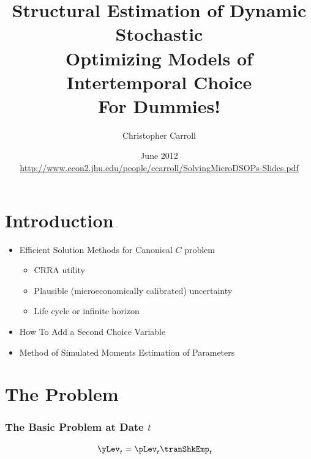\documentclass{beamer}
\begin{document}
\title[SolvingMicroDSOPs]{\textbf{Structural Estimation of Dynamic Stochastic\\ Optimizing Models of Intertemporal Choice \\ \LARGE{For Dummies!}}}
\author[Carroll]{Christopher Carroll}

\date{June 2012 \\ {\tiny \url{http://www.econ2.jhu.edu/people/ccarroll/SolvingMicroDSOPs-Slides.pdf}}
}


\begin{frame}[plain]
  \titlepage
\end{frame}

\section{Introduction}

\begin{frame}
\begin{itemize}
\item Efficient Solution Methods for Canonical $C$ problem
\begin{itemize}
\item CRRA utility
\item Plausible (microeconomically calibrated) uncertainty
\item Life cycle or infinite horizon
\end{itemize}
\item How To Add a Second Choice Variable
\item Method of Simulated Moments Estimation of Parameters
\end{itemize}
\end{frame}

\section{The Problem}

\begin{frame}[label=MaxProb]
\frametitle{\large\textbf{The Basic Problem at Date $t$}}


\begin{equation}\begin{gathered}\begin{aligned}
{\yLev}_{t}  & = {\pLev}_{t}\tranShkEmp_{t}
\end{aligned}\end{gathered}\end{equation}

\end{frame}
\end{document}
